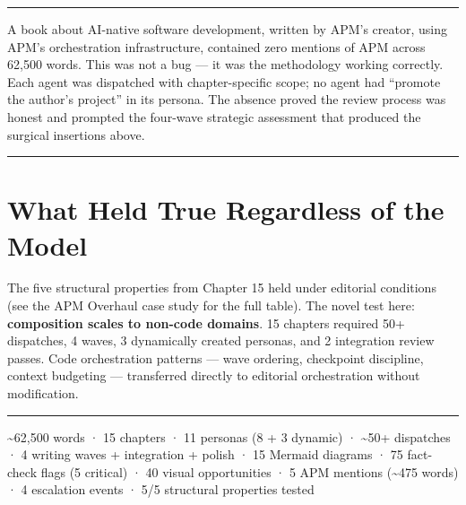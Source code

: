\documentclass[
  a4paper,
  DIV=11,
  numbers=noendperiod]{scrreprt}
\begin{document}
\begin{center}\rule{0.5\linewidth}{0.5pt}\end{center}

A book about AI-native software development, written by APM's creator,
using APM's orchestration infrastructure, contained zero mentions of APM
across 62,500 words. This was not a bug --- it was the methodology
working correctly. Each agent was dispatched with chapter-specific
scope; no agent had ``promote the author's project'' in its persona. The
absence proved the review process was honest and prompted the four-wave
strategic assessment that produced the surgical insertions above.

\begin{center}\rule{0.5\linewidth}{0.5pt}\end{center}

\section{What Held True Regardless of the
Model}\label{what-held-true-regardless-of-the-model-1}

The five structural properties from Chapter 15 held under editorial
conditions (see the APM Overhaul case study for the full table). The
novel test here: \textbf{composition scales to non-code domains}. 15
chapters required 50+ dispatches, 4 waves, 3 dynamically created
personas, and 2 integration review passes. Code orchestration patterns
--- wave ordering, checkpoint discipline, context budgeting ---
transferred directly to editorial orchestration without modification.

\begin{center}\rule{0.5\linewidth}{0.5pt}\end{center}

\begin{tcolorbox}[enhanced jigsaw, arc=.35mm, bottomrule=.15mm, bottomtitle=1mm, breakable, colback=white, colbacktitle=quarto-callout-note-color!10!white, colframe=quarto-callout-note-color-frame, coltitle=black, left=2mm, leftrule=.75mm, opacityback=0, opacitybacktitle=0.6, rightrule=.15mm, title=\textcolor{quarto-callout-note-color}{\faInfo}\hspace{0.5em}{Metrics}, titlerule=0mm, toprule=.15mm, toptitle=1mm]

\textasciitilde62,500 words · 15 chapters · 11 personas (8 + 3 dynamic)
· \textasciitilde50+ dispatches · 4 writing waves + integration + polish
· 15 Mermaid diagrams · 75 fact-check flags (5 critical) · 40 visual
opportunities · 5 APM mentions (\textasciitilde475 words) · 4 escalation
events · 5/5 structural properties tested

\end{tcolorbox}
\end{document}
